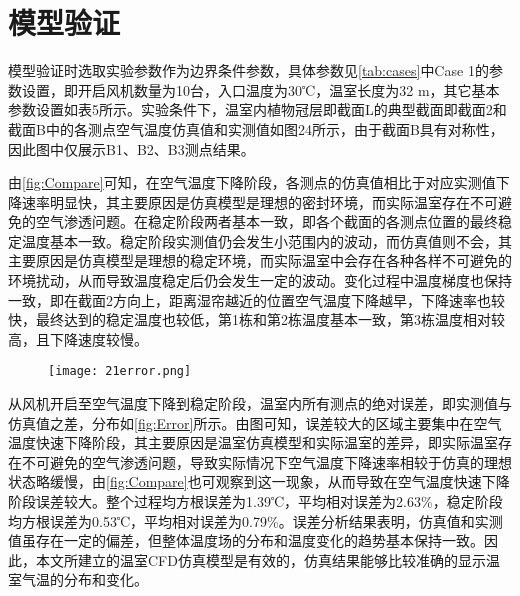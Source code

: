 \section{模型验证}
模型验证时选取实验参数作为边界条件参数，具体参数见\ref{tab:cases}中Case 1的参数设置，即开启风机数量为10台，入口温度为30℃，温室长度为32 m，其它基本参数设置如表5所示。实验条件下，温室内植物冠层即截面L的典型截面即截面2和截面B中的各测点空气温度仿真值和实测值如图24所示，由于截面B具有对称性，因此图中仅展示B1、B2、B3测点结果。
	\begin{figure}[!htp]
		\centering
 	\end{figure}
由\ref{fig:Compare}可知，在空气温度下降阶段，各测点的仿真值相比于对应实测值下降速率明显快，其主要原因是仿真模型是理想的密封环境，而实际温室存在不可避免的空气渗透问题。在稳定阶段两者基本一致，即各个截面的各测点位置的最终稳定温度基本一致。稳定阶段实测值仍会发生小范围内的波动，而仿真值则不会，其主要原因是仿真模型是理想的稳定环境，而实际温室中会存在各种各样不可避免的环境扰动，从而导致温度稳定后仍会发生一定的波动。变化过程中温度梯度也保持一致，即在截面2方向上，距离湿帘越近的位置空气温度下降越早，下降速率也较快，最终达到的稳定温度也较低，第1栋和第2栋温度基本一致，第3栋温度相对较高，且下降速度较慢。
	\begin{figure}[!htp]
		\centering
		\texttt{[image: 21error.png]}
	\end{figure}
从风机开启至空气温度下降到稳定阶段，温室内所有测点的绝对误差，即实测值与仿真值之差，分布如\ref{fig:Error}所示。由图可知，误差较大的区域主要集中在空气温度快速下降阶段，其主要原因是温室仿真模型和实际温室的差异，即实际温室存在不可避免的空气渗透问题，导致实际情况下空气温度下降速率相较于仿真的理想状态略缓慢，由\ref{fig:Compare}也可观察到这一现象，从而导致在空气温度快速下降阶段误差较大。整个过程均方根误差为1.39℃，平均相对误差为2.63\%，稳定阶段均方根误差为0.53℃，平均相对误差为0.79\%。误差分析结果表明，仿真值和实测值虽存在一定的偏差，但整体温度场的分布和温度变化的趋势基本保持一致。因此，本文所建立的温室CFD仿真模型是有效的，仿真结果能够比较准确的显示温室气温的分布和变化。

